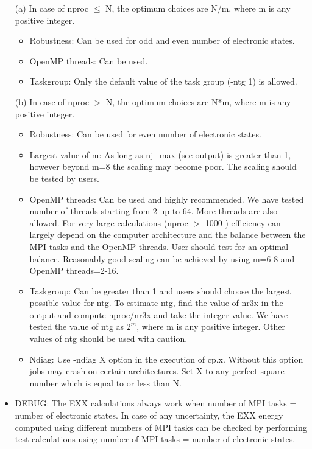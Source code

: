 \documentclass[12pt,a4paper]{article}
\begin{document}
\begin{itemize}
  \item[(a)] In case of nproc $\leq$ N, the optimum choices are N/m, where m is any positive integer.
    \begin{itemize}
      \item Robustness:  Can be used for odd and even number of electronic states.
      \item OpenMP threads:  Can be used.
      \item Taskgroup:  Only the default value of the task group (-ntg 1) is allowed.
    \end{itemize}
  \item[(b)] In case of nproc  $>$ N, the optimum choices are N*m, where m is any positive integer.
    \begin{itemize}
      \item Robustness:  Can be used for even number of electronic states.
      \item Largest value of m:  As long as nj\_max (see output) is greater than 1, 
        however beyond m=8 the scaling may become poor. The scaling should be tested by users.
      \item OpenMP threads: Can be used and highly recommended. We have tested number of threads
        starting from 2 up to 64. More threads are also allowed. 
        For very large calculations (nproc $>$ 1000 ) efficiency can largely depend on the computer 
        architecture and the balance between the MPI tasks and the OpenMP threads. 
        User should test for an optimal balance. Reasonably good scaling can be achieved by using 
        m=6-8 and OpenMP threads=2-16.
      \item Taskgroup:  Can be greater than 1 and users should choose the largest possible value
        for ntg. To estimate ntg, find the value of nr3x in the output and compute nproc/nr3x and
        take the integer value. We have tested the value of ntg as $2^m$, where m is any positive integer. 
        Other values of ntg should be used with caution.
      \item Ndiag:  Use -ndiag X option in the execution of cp.x. Without this option jobs
        may crash on certain architectures. Set X to any perfect square number which is equal to or less than N.
    \end{itemize}
  \item DEBUG:  The EXX calculations always work when number of MPI tasks = number of electronic states.
    In case of any uncertainty, the EXX energy computed using different numbers of MPI tasks can be
    checked by performing test calculations using number of MPI tasks = number of electronic states.
\end{itemize}
\end{document}
